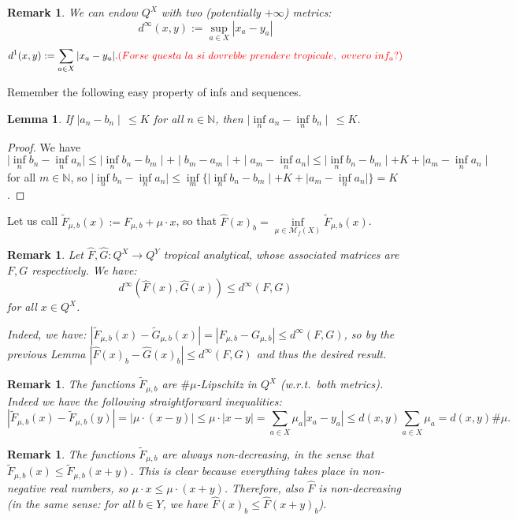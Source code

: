 \documentclass[submission,copyright,creativecommons]{eptcs}
\newtheorem{Lemma}[theorem]{Lemma}
\newtheorem{Remark}[theorem]{Remark}
\newcommand{\N}{\mathbb{N}}
\newcommand{\set}[1]{\{#1\}}
\newcommand{\fmsets}[1]{\mathcal{M}_f(#1)} %
\newcommand{\alarm}[1]{\color{red}#1\color{black}}
\begin{document}
\begin{Remark}
We can endow $Q^X$ with two (potentially $+\infty$) metrics:
\[d^{\infty}(x,y):=\sup\limits_{a\in X}|x_a-y_a|\]
\[d^1(x,y):=\sum\limits_{a\in X}|x_a-y_a|. \alarm{(Forse \ questa \ la \ si \ dovrebbe \ prendere \ tropicale, \ ovvero \ inf_a ?)}\]
\end{Remark}

Remember the following easy property of infs and sequences.

\begin{Lemma}
If $\mid a_n-b_n\mid \,\leq K$ for all $n \in\N$, then $\mid \inf\limits_n a_n-\inf\limits_n b_n\mid \,\leq K$.
\end{Lemma}
\begin{proof}
We have $\mid \inf\limits_n b_n - \inf\limits_n a_n\mid \leq \mid \inf\limits_n b_n - b_{m}\mid + \mid b_{m} - a_m\mid + \mid a_m - \inf\limits_n a_n\mid\leq \mid \inf\limits_n b_n - b_{m}\mid + K + \mid a_m - \inf\limits_n a_n\mid$  for all $m\in\N$, so $\mid \inf\limits_n b_n - \inf\limits_n a_n\mid \leq \inf\limits_m \set{\mid \inf\limits_n b_n - b_{m}\mid + K + \mid a_m - \inf\limits_n a_n\mid} = K$.
\end{proof}

Let us call $\widetilde{F}_{\mu,b}(x):=F_{\mu,b}+\mu\cdot x$, so that $\hat{F}(x)_b = \inf\limits_{\mu\in\fmsets{X}} \widetilde{F}_{\mu,b}(x)$.

\begin{Remark}
Let $\hat F, \hat G : Q^X\to Q^Y$ tropical analytical, whose associated matrices are $F,G$ respectively.
We have:
\[
 d^{\infty}(\hat F(x),\hat{G}(x)) \leq  d^{\infty}(F,G)
\]
for all $x\in Q^X$.

Indeed, we have:
$|\widetilde{F}_{\mu,b}(x)-\widetilde{G}_{\mu,b}(x)|=|F_{\mu,b}-G_{\mu,b}|\leq d^{\infty}(F,G)$, so by the previous Lemma $|\hat F(x)_b-\hat{G}(x)_b|\leq d^{\infty}(F,G)$ and thus the desired result.
\end{Remark}

\begin{Remark}
The functions $\widetilde{F}_{\mu,b}$ are $\#\mu$-Lipschitz in $Q^X$ (w.r.t.\ both metrics).
Indeed we have the following straightforward inequalities:
\[
 |\widetilde{F}_{\mu,b}(x)-\widetilde{F}_{\mu,b}(y)| =
 | \mu\cdot (x-y) | \leq
 \mu\cdot| x-y | =
 \sum\limits_{a\in X} \mu_a | x_a - y_a | \leq
 d(x,y)\sum\limits_{a\in X} \mu_a = 
 d(x,y)\#\mu.
\]
\end{Remark}

\begin{Remark}
The functions $\widetilde{F}_{\mu,b}$ are always non-decreasing, in the sense that $\widetilde{F}_{\mu,b}(x)\leq \widetilde{F}_{\mu,b}(x+y)$.
This is clear because everything takes place in non-negative real numbers, so $\mu\cdot x\leq \mu\cdot (x+y)$.
Therefore, also $\hat{F}$ is non-decreasing (in the same sense: for all $b\in Y$, we have $\hat F (x)_b\leq \hat F (x+y)_b$).
\end{Remark}
\end{document}
